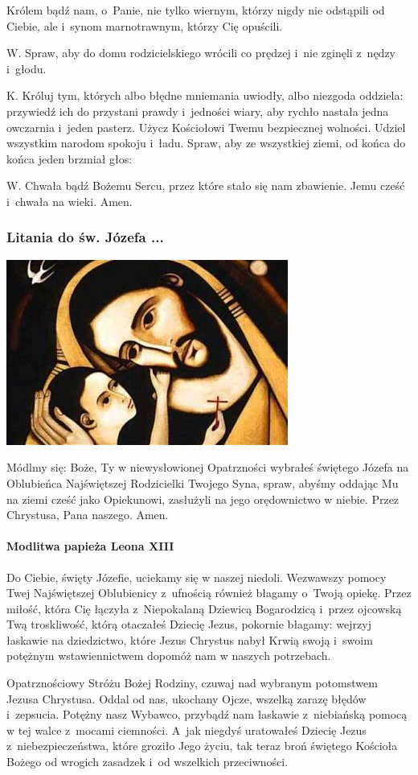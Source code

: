 \documentclass[twocolumn,fleqn,oneside,openany,a5paper,12pt]{book}
\def\mysec#1{\subsubsection*{#1}\addcontentsline{toc}{chapter}{#1}}
\begin{document}
Królem bądź nam, o~Panie, nie tylko wiernym, którzy nigdy nie odstąpili od Ciebie, ale i~synom marnotrawnym, którzy Cię opuścili.

W. Spraw, aby do domu rodzicielskiego wrócili co prędzej i~nie zginęli z~nędzy i~głodu.

K. Króluj tym, których albo błędne mniemania uwiodły, albo niezgoda oddziela: przywiedź ich do przystani prawdy i~jedności wiary, aby rychło nastała jedna owczarnia i~jeden pasterz. Użycz Kościołowi Twemu bezpiecznej wolności. Udziel wszystkim narodom spokoju i~ładu. Spraw, aby ze wszystkiej ziemi, od końca do końca jeden brzmiał głos:

W. Chwała bądź Bożemu Sercu, przez które stało się nam zbawienie. Jemu cześć i~chwała na wieki. Amen.\vfill



\mysec{Litania do św. Józefa ...}
\begin{center}
\includegraphics[width=.4\textwidth]{swJozef.jpg}
\end{center}
Módlmy się:
Boże, Ty w niewysłowionej Opatrzności wybrałeś świętego Józefa na Oblubieńca Najświętszej Rodzicielki Twojego Syna, spraw, abyśmy oddając Mu na ziemi cześć jako Opiekunowi, zasłużyli na jego orędownictwo w niebie. Przez Chrystusa, Pana naszego. Amen.
\newpage
\paragraph{Modlitwa papieża Leona XIII}
Do Ciebie, święty Józefie, uciekamy się w naszej niedoli. Wezwawszy pomocy Twej Najświętszej Oblubienicy z~ufnością również błagamy o~Twoją opiekę. Przez miłość, która Cię łączyła z~Niepokalaną Dziewicą Bogarodzicą i~przez ojcowską Twą troskliwość, którą otaczałeś Dziecię Jezus, pokornie błagamy: wejrzyj łaskawie na dziedzictwo, które Jezus Chrystus nabył Krwią swoją i~swoim potężnym wstawiennictwem dopomóż nam w naszych potrzebach. 

Opatrznościowy Stróżu Bożej Rodziny, czuwaj nad wybranym potomstwem Jezusa Chrystusa. Oddal od nas, ukochany Ojcze, wszelką zarazę błędów i~zepsucia. Potężny nasz Wybawco, przybądź nam łaskawie z~niebiańską pomocą w tej walce z~mocami ciemności. A~jak niegdyś uratowałeś Dziecię Jezus z~niebezpieczeństwa, które groziło Jego życiu, tak teraz broń świętego Kościoła Bożego od wrogich zasadzek i~od wszelkich przeciwności. 
\end{document}
